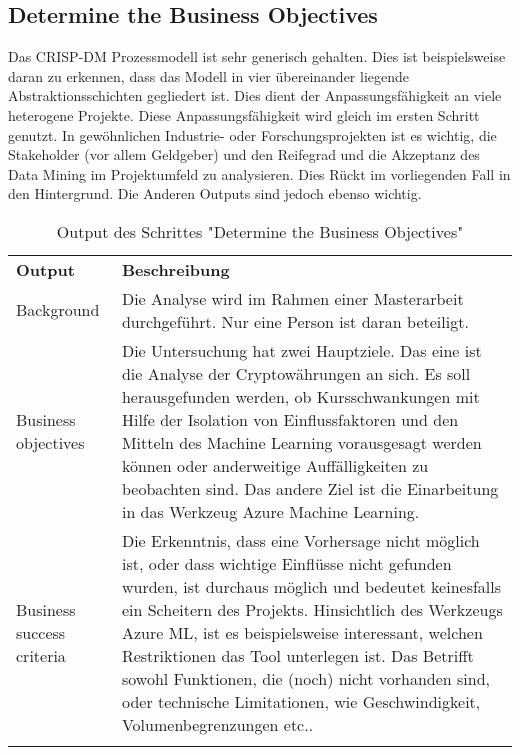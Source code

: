 \subsection{Determine the Business Objectives}
Das CRISP-DM Prozessmodell ist sehr generisch gehalten. Dies ist beispielsweise daran zu erkennen, dass das Modell in vier übereinander liegende Abstraktionsschichten gegliedert ist.\citep[S.~6]{chapman_crisp-dm_2000} Dies dient der Anpassungsfähigkeit an viele heterogene Projekte. Diese Anpassungsfähigkeit wird gleich im ersten Schritt genutzt.\newline
In  gewöhnlichen Industrie- oder Forschungsprojekten ist es wichtig, die Stakeholder (vor allem Geldgeber) und den Reifegrad und die Akzeptanz des Data Mining im Projektumfeld zu analysieren. Dies Rückt im vorliegenden Fall in den Hintergrund. Die Anderen Outputs sind jedoch ebenso wichtig.

\begin{longtable}[H]{|p{}|p{12cm}|}
\hline
\textbf{Output} & \textbf{Beschreibung} \\ 
\hhline{==}
Background & Die Analyse wird im Rahmen einer Masterarbeit durchgeführt. Nur eine Person ist daran beteiligt. \\
\hline
Business objectives & Die Untersuchung hat zwei Hauptziele. Das eine ist die Analyse der Cryptowährungen an sich. Es soll herausgefunden werden, ob Kursschwankungen mit Hilfe der Isolation von Einflussfaktoren und den Mitteln des Machine Learning vorausgesagt werden können oder anderweitige Auffälligkeiten zu beobachten sind. Das andere Ziel ist die Einarbeitung in das Werkzeug Azure Machine Learning. \\
\hline
Business success criteria & Die Erkenntnis, dass eine Vorhersage nicht möglich ist, oder dass wichtige Einflüsse nicht gefunden wurden, ist durchaus möglich und bedeutet keinesfalls ein Scheitern des Projekts. Hinsichtlich des Werkzeugs Azure ML, ist es beispielsweise interessant, welchen Restriktionen das Tool unterlegen ist. Das Betrifft sowohl Funktionen, die (noch) nicht vorhanden sind, oder technische Limitationen, wie Geschwindigkeit, Volumenbegrenzungen etc..\\
\hline
\caption{Output des Schrittes "Determine the Business Objectives"}
\end{longtable}

